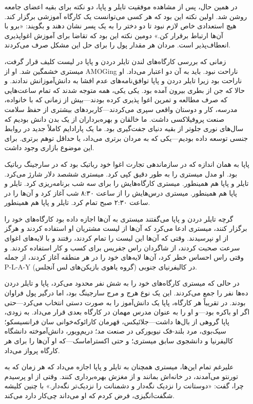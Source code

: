 در همین حال، پس از مشاهده موفقیت تایلر و پاپا، دو نکته برای بقیه اعضای جامعه روشن شد. اولین نکته این بود که هر کسی می‌توانست یک کارگاه آموزشی برگزار کند. هیچ استعدادی خاص لازم نبود تا دو دختر را به یک پسر نشان دهند و بگویند: «برو با آن‌ها ارتباط برقرار کن.» دومین نکته این بود که تقاضا برای آموزش اغواپذیری انعطاف‌پذیر است. مردان هر مقدار پول را برای حل این مشکل صرف می‌کردند.

زمانی که بررسی کارگاه‌های لندن تایلر دردن و پاپا در لیست کلیف قرار گرفت، میستری خشمگین شد. او از AMOGing ناراحت نبود. باید به آن دو اعتبار می‌داد. او ناراحت بود زیرا تایلر دردن و پاپا توافق‌نامه‌های عدم افشا به دانش‌آموزانش ندادند. و حالا که جن از بطری بیرون آمده بود. یکی یکی، همه متوجه شدند که تمام ساعت‌هایی که صرف مطالعه و تمرین اغوا پ‍‍ذیری کرده بودند—بیش از زمانی که با خانواده، مدرسه، کار و دوستان واقعی سپری می‌کردند—کاربردهای بیشتری از حفظ سلامت صنعت پروفیلاکسی داشت. ما خالقان و بهره‌برداران از یک بدن دانش بودیم که سال‌های نوری جلوتر از بقیه دنیای جفت‌گیری بود. ما یک پارادایم کاملاً جدید در روابط جنسی توسعه داده بودیم—یکی که به مردان برتری می‌داد، یا حداقل توهم برتری. برای این موضوع بازاری وجود داشت.

پاپا به همان اندازه که در سازماندهی تجارت اغوا خود رباتیک بود که در سارجینگ رباتیک بود. او مدل میستری را به طور دقیق کپی کرد. میستری ششصد دلار شارژ می‌کرد. تایلر و پاپا هم همینطور. میستری کارگاه‌هایش را برای سه شب برنامه‌ریزی کرد. تایلر و پاپا هم همینطور. میستری درس‌هایش را از ساعت ۸:۳۰ شب آغاز کرد و آن‌ها را در ساعت ۲:۳۰ صبح تمام کرد. تایلر و پاپا هم همینطور.

گرچه تایلر دردن و پاپا می‌گفتند میستری به آن‌ها اجازه داده بود کارگاه‌های خود را برگزار کنند، میستری ادعا می‌کرد که آن‌ها از لیست مشتریان او استفاده کردند و هرگز از او نپرسیدند. وقتی که آن‌ها این لیست را تمام کردند، رفتند و با لایه‌های اغوای سرعت صحبت کردند، از شاگردان راس جفریس برای کسب و کار استفاده کردند. و وقتی راس احساس خطر کرد، آن‌ها لایه‌های خود را در هر منطقه آغاز کردند، از جمله P-L-A-Y (گروه یاهوی بازیکن‌های لس آنجلس) در کالیفرنیای جنوبی.

در حالی که میستری کارگاه‌های خود را به شش نفر محدود می‌کرد، پاپا و تایلر دردن ده‌ها نفر را جمع می‌کردند. این یک نوع هرج و مرج سارجینگ بود، اما درگیر پول فراوان بودند. در تقریباً هر کارگاه، پاپا یک دانش‌آموز را به صورت دستی انتخاب می‌کرد—حتی اگر او باکره بود—و او را به عنوان مدرس مهمان در کارگاه بعدی قرار می‌داد. به زودی، پاپا گروهی از بال‌ها داشت—جلائیکس، قهرمان کارائوکه‌خوانی سان فرانسیسکو؛ سیک‌بوی، مرد بلند-فک نیویورکی در صنعت مد؛ دریم‌ویور، دانش‌آموخته دانشگاه کالیفرنیا و دانشجوی سابق میستری؛ و حتی اکسترا‌ماسک—که او آن‌ها را برای هر کارگاه پرواز می‌داد.

علیرغم تمام این‌ها، میستری همچنان به تایلر و پاپا اجازه می‌داد که هر زمان که به تورنتو می‌آمدند، در خانه‌اش بمانند و از مغزش بهره‌برداری کنند. وقتی از او پرسیدم چرا، گفت: «دوستانت را نزدیک نگه‌دار و دشمنانت را نزدیک‌تر نگه‌دار.» با چنین کلیشه شگفت‌انگیزی، فرض کردم که او می‌داند چی‌کار دارد می‌کند.